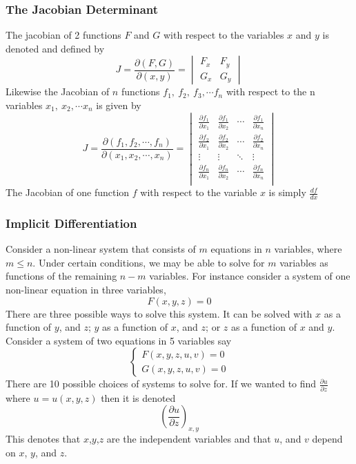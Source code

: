 \documentclass[14pt]{article}
\begin{document}
    \subsubsection{The Jacobian Determinant}
    The jacobian of 2 functions $F$ and $G$ with respect to the variables $x$ and $y$ is denoted and defined by
    $$J=\frac{\partial(F, G)}{\partial(x, y)}=\begin{vmatrix}
        F_x& F_y\\
        G_x& G_y
    \end{vmatrix}$$
    Likewise the Jacobian of $n$ functions $f_1,\ f_2,\ f_3,\cdots f_n$ with respect to the n variables $x_1,\ x_2,\cdots x_n$ is given by
    $$J=\frac{\partial(f_1, f_2,\cdots, f_n)}{\partial(x_1, x_2,\cdots, x_n)}=\begin{vmatrix}
        \frac{\partial f_1}{\partial x_1} & \frac{\partial f_1}{\partial x_2} & \cdots& \frac{\partial f_1}{\partial x_n}\\
        \frac{\partial f_2}{\partial x_1}&\frac{\partial f_2}{\partial x_2} & \cdots& \frac{\partial f_2}{\partial x_n}\\
        \vdots& \vdots&\ddots & \vdots\\
        \frac{\partial f_n}{\partial x_1}& \frac{\partial f_n}{\partial x_2}& \cdots&\frac{\partial f_n}{\partial x_n} \\
    \end{vmatrix}$$
    The Jacobian of one function $f$ with respect to the variable $x$ is simply $\frac{df}{dx}$
    \subsubsection{Implicit Differentiation}
    Consider a non-linear system that consists of $m$ equations in $n$ variables, where $m\leq n$. Under certain conditions, we may be able to solve for $m$ variables as functions of the remaining $n-m$ variables. For instance consider a system of one non-linear equation in three variables,
    $$F(x,y,z)=0$$
    There are three possible ways to solve this system. It can be solved with $x$ as a function of $y$, and $z$; $y$ as a function of $x$, and $z$; or $z$ as a function of $x$ and $y$. Consider a system of two equations in 5 variables say 
    $$\left\{\begin{array}{lr}
        F(x,y,z,u,v)=0\\
        G(x,y,z,u,v)=0
    \end{array}\right.$$
    There are 10 possible choices of systems to solve for. If we wanted to find $\frac{\partial u}{\partial z}$ where $u=u(x,y,z)$ then it is denoted
    $$\left(\frac{\partial u}{\partial z}\right)_{x,y}$$
    This denotes that $x$,$y$,$z$ are the independent variables and that $u$, and $v$ depend on $x$, $y$, and $z$.
\end{document}
